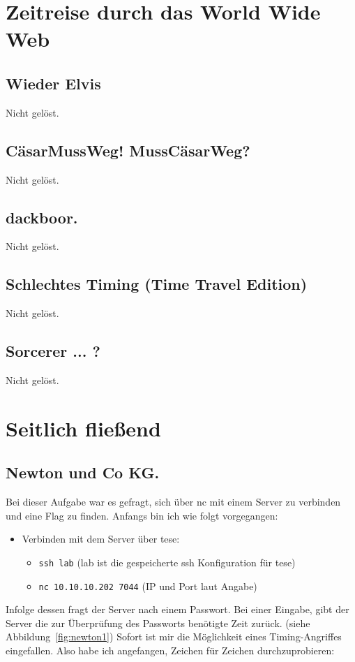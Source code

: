 \documentclass[12pt, a4paper, titlepage, oneside]{scrartcl}
\begin{document}
	\section{Zeitreise durch das World Wide Web}

	\subsection{Wieder Elvis}
	Nicht gelöst.

	\subsection{C\"asarMussWeg! MussC\"asarWeg?}
	Nicht gelöst.

	\subsection{dackboor.}
	Nicht gelöst.

	\subsection{Schlechtes Timing (Time Travel Edition)}
	Nicht gelöst.

	\subsection{Sorcerer ... ?}
	Nicht gelöst.

	\newpage

	\section{Seitlich fließend}

	\subsection{Newton und Co KG.}
	Bei dieser Aufgabe war es gefragt, sich über nc mit einem Server zu verbinden
	und eine Flag zu finden. Anfangs bin ich wie folgt vorgegangen:
	\begin{itemize}
		\item Verbinden mit dem Server über tese:
			\begin{itemize}
				\item \lstinline{ssh lab} (lab ist die gespeicherte ssh Konfiguration für
					tese)

				\item \lstinline{nc 10.10.10.202 7044} (IP und Port laut Angabe)
			\end{itemize}
	\end{itemize}
	Infolge dessen fragt der Server nach einem Passwort. Bei einer Eingabe, gibt
	der Server die zur Überprüfung des Passworts benötigte Zeit zurück. (siehe
	Abbildung~\ref*{fig:newton1}) Sofort ist mir die Möglichkeit eines Timing-Angriffes
	eingefallen. Also habe ich angefangen, Zeichen für Zeichen durchzuprobieren:
\end{document}
